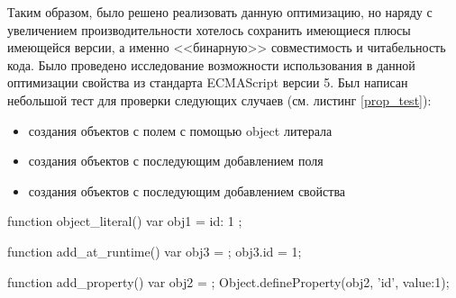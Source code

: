 \begin{code}
\end{code}

Таким образом, было решено реализовать данную оптимизацию, но наряду с увеличением производительности хотелось сохранить имеющиеся плюсы имеющейся версии, а именно <<бинарную>> совместимость и читабельность кода. Было проведено исследование возможности использования в данной оптимизации свойства из стандарта ECMAScript версии 5\cite{ES5}. Был написан небольшой тест для проверки следующих случаев (см. листинг \ref{prop_test}):
\begin{itemize}
	\item создания объектов с полем с помощью object литерала
	\item создания объектов с последующим добавлением поля
	\item создания объектов с последующим добавлением свойства
\end{itemize}

\begin{code}
\begin{JavaScript}[caption=Тест производительности для сравнения скорости создания объектов с полем и свойством, label=prop_test]
function object_literal() {
	var obj1 = { id: 1 };
}

function add_at_runtime() {
    var obj3 = {};
    obj3.id = 1;
}

function add_property() {
    var obj2 = {};
    Object.defineProperty(obj2, 'id', {value:1});
}   
\end{JavaScript}
\end{code}

